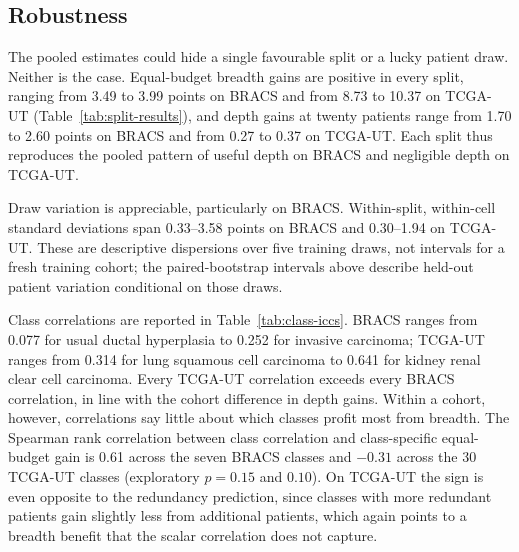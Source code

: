 \subsection{Robustness}
\label{sec:robustness}
The pooled estimates could hide a single favourable split or a lucky patient draw. Neither is the case. Equal-budget breadth gains are positive in every split, ranging from 3.49 to 3.99 points on BRACS and from 8.73 to 10.37 on TCGA-UT (Table~\ref{tab:split-results}), and depth gains at twenty patients range from 1.70 to 2.60 points on BRACS and from 0.27 to 0.37 on TCGA-UT. Each split thus reproduces the pooled pattern of useful depth on BRACS and negligible depth on TCGA-UT.

\begin{table}[htbp]
\centering\small

\caption{Every split favours breadth at the equal budget and reproduces the cohort difference in depth gains. Contrasts are in points and average five draws per cell. Draw SD is computed within each split and cell with divisor five, and the displayed range spans the nine cells. Splits overlap and are not independent cohort replications.}
\label{tab:split-results}
\end{table}

\noindent Draw variation is appreciable, particularly on BRACS. Within-split, within-cell standard deviations span 0.33--3.58 points on BRACS and 0.30--1.94 on TCGA-UT. These are descriptive dispersions over five training draws, not intervals for a fresh training cohort; the paired-bootstrap intervals above describe held-out patient variation conditional on those draws.

Class correlations are reported in Table~\ref{tab:class-iccs}. BRACS ranges from 0.077 for usual ductal hyperplasia to 0.252 for invasive carcinoma; TCGA-UT ranges from 0.314 for lung squamous cell carcinoma to 0.641 for kidney renal clear cell carcinoma. Every TCGA-UT correlation exceeds every BRACS correlation, in line with the cohort difference in depth gains. Within a cohort, however, correlations say little about which classes profit most from breadth. The Spearman rank correlation between class correlation and class-specific equal-budget gain is 0.61 across the seven BRACS classes and $-0.31$ across the 30 TCGA-UT classes (exploratory $p=0.15$ and $0.10$). On TCGA-UT the sign is even opposite to the redundancy prediction, since classes with more redundant patients gain slightly less from additional patients, which again points to a breadth benefit that the scalar correlation does not capture.

